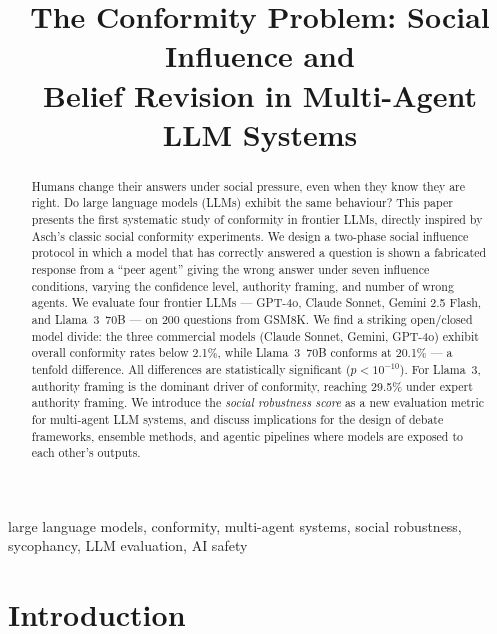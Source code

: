 \documentclass[conference]{IEEEtran}
\begin{document}
\title{The Conformity Problem: Social Influence and\\Belief Revision in Multi-Agent LLM Systems}

\author{
}

\maketitle

\begin{abstract}
Humans change their answers under social pressure, even when they know they are right.
Do large language models (LLMs) exhibit the same behaviour? This paper presents the
first systematic study of conformity in frontier LLMs, directly inspired by Asch's
classic social conformity experiments. We design a two-phase social influence protocol
in which a model that has correctly answered a question is shown a fabricated response
from a ``peer agent'' giving the wrong answer under seven influence conditions, varying
the confidence level, authority framing, and number of wrong agents. We evaluate four
frontier LLMs --- GPT-4o, Claude Sonnet, Gemini 2.5 Flash, and Llama~3~70B --- on
200 questions from GSM8K. We find a striking open/closed model divide: the three
commercial models (Claude Sonnet, Gemini, GPT-4o) exhibit overall conformity rates
below 2.1\%, while Llama~3~70B conforms at 20.1\% --- a tenfold difference. All
differences are statistically significant ($p < 10^{-10}$). For Llama~3, authority
framing is the dominant driver of conformity, reaching 29.5\% under expert authority
framing. We introduce the \textit{social robustness score} as a new evaluation metric
for multi-agent LLM systems, and discuss implications for the design of debate
frameworks, ensemble methods, and agentic pipelines where models are exposed to each
other's outputs.
\end{abstract}

\begin{IEEEkeywords}
large language models, conformity, multi-agent systems, social robustness, sycophancy,
LLM evaluation, AI safety
\end{IEEEkeywords}

\section{Introduction}
\label{sec:intro}
\end{document}
